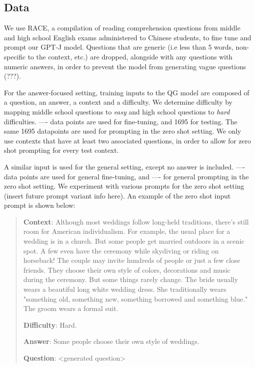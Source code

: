 \documentclass[11pt]{article}
\begin{document}
\subsection{Data}

We use RACE, a compilation of reading comprehension questions from middle and high school English exams administered to Chinese students, to fine tune and prompt our GPT-J model. Questions that are generic (i.e less than 5 words, non-specific to the context, etc.) are dropped, alongside with any questions with numeric answers, in order to prevent the model from generating vague questions (???). 

For the answer-focused setting, training inputs to the QG model are composed of a question, an answer, a context and a difficulty. We determine difficulty by mapping middle school questions to \textit{easy} and high school questions to \textit{hard} difficulties.   ---- data points are used for fine-tuning, and 1695 for testing. The same 1695 datapoints are used for prompting in the zero shot setting. We only use contexts that have at least two associated questions, in order to allow for zero shot prompting for every test context.  

A similar input is used for the general setting, except no answer is included.  ---- data points are used for general fine-tuning, and ---- for general prompting in the zero shot setting. We experiment with various prompts for the zero shot setting (insert future prompt variant info here). An example of the zero shot input prompt is shown below: 

\begin{quote}
\textbf{Context}: Although most weddings follow long-held traditions, there's still room for American individualism. For example, the usual place for a wedding is in a church. But some people get married outdoors in a scenic spot. A few even have the ceremony while skydiving or riding on horseback! The couple may invite hundreds of people or just a few close friends. They choose their own style of colors, decorations and music during the ceremony. But some things rarely change. The bride usually wears a beautiful long white wedding dress. She traditionally wears "something old, something new, something borrowed and something blue." The groom wears a formal suit.

\textbf{Difficulty}: Hard. 

\textbf{Answer}: Some people choose their own style of weddings. 

\textbf{Question}: <generated question>

\end{quote}
\end{document}
